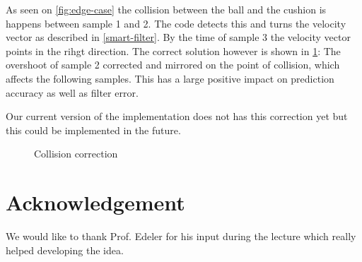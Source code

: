\documentclass[notitlepage, a4paper, 11pt]{scrartcl}
\begin{document}
\begin{multicols}{2}
As seen on \cref{fig:edge-case} the collision between the ball and the cushion is happens between sample 1 and 2. The code detects this and turns the velocity vector as described in \cref{smart-filter}.
By the time of sample 3 the velocity vector points in the rihgt direction. The correct solution however is shown in \cref{fig:edge-case-sol}:
The overshoot of sample 2 corrected and mirrored on the point of collision, which affects the following samples. This has a large positive impact on prediction accuracy as well as filter error.

Our current version of the implementation does not has this correction yet but this could be implemented in the future.

\begin{figure}[H]
    \centering
    \caption{Collision correction}
    \label{fig:edge-case-sol}
\end{figure}

\section{Acknowledgement}

We would like to thank Prof. Edeler for his input during the lecture which really helped developing the idea.

\end{multicols}

 

\end{document}
